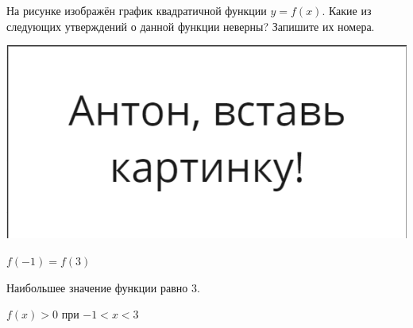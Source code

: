 \begin{class}[number=3]
\begin{listofex}
		\item 
		\begin{minipage}[t]{0.57\textwidth}
			На рисунке изображён график квадратичной функции \( y=f(x) \). Какие из следующих утверждений о данной функции неверны? Запишите их номера.
		\end{minipage}
		\begin{minipage}[c]{0.3\textwidth}
			\includegraphics[align=t, width=\textwidth]{pics/G91M4L4-1}
		\end{minipage}
		\begin{enumcols}[itemcolumns=1]
			\item \( f(-1)=f(3) \)
			\item Наибольшее значение функции равно \( 3 \).
			\item \( f(x)>0 \) при \( -1<x<3 \)
		\end{enumcols}
	

\end{listofex}
\end{class}
